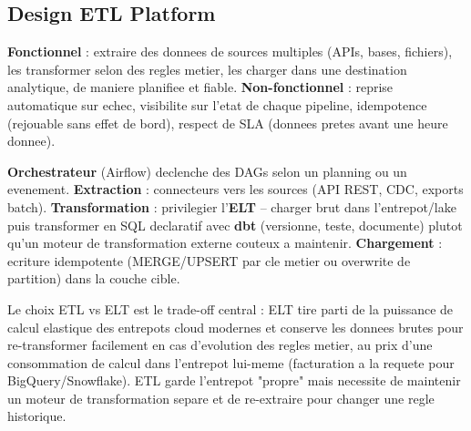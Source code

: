 \documentclass[11pt,a4paper]{article}
\newenvironment{sujet}[1]{%
  \subsection{#1}
}{%
  \bigskip
}
\begin{document}
\begin{sujet}{Design ETL Platform}

\begin{req}
\textbf{Fonctionnel} : extraire des donnees de sources multiples (APIs, bases, fichiers), les transformer selon des regles metier, les charger dans une destination analytique, de maniere planifiee et fiable. \textbf{Non-fonctionnel} : reprise automatique sur echec, visibilite sur l'etat de chaque pipeline, idempotence (rejouable sans effet de bord), respect de SLA (donnees pretes avant une heure donnee).
\end{req}

\begin{archbox}
\textbf{Orchestrateur} (Airflow) declenche des DAGs selon un planning ou un evenement. \textbf{Extraction} : connecteurs vers les sources (API REST, CDC, exports batch). \textbf{Transformation} : privilegier l'\textbf{ELT} -- charger brut dans l'entrepot/lake puis transformer en SQL declaratif avec \textbf{dbt} (versionne, teste, documente) plutot qu'un moteur de transformation externe couteux a maintenir. \textbf{Chargement} : ecriture idempotente (MERGE/UPSERT par cle metier ou overwrite de partition) dans la couche cible.
\end{archbox}

\begin{tradeoff}
Le choix ETL vs ELT est le trade-off central : ELT tire parti de la puissance de calcul elastique des entrepots cloud modernes et conserve les donnees brutes pour re-transformer facilement en cas d'evolution des regles metier, au prix d'une consommation de calcul dans l'entrepot lui-meme (facturation a la requete pour BigQuery/Snowflake). ETL garde l'entrepot "propre" mais necessite de maintenir un moteur de transformation separe et de re-extraire pour changer une regle historique.
\end{tradeoff}

\end{sujet}
\end{document}
